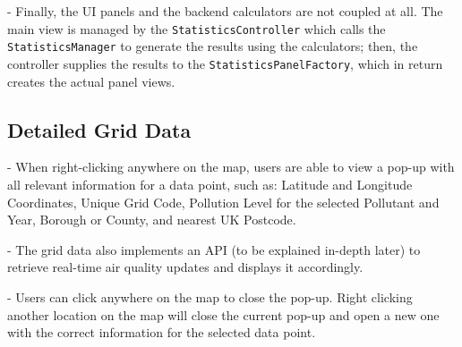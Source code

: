     - Finally, the UI panels and the backend calculators are not coupled at all. The main view is managed by the \verb|StatisticsController| which calls the \verb|StatisticsManager| to generate the results using the calculators; then, the controller supplies the results to the \verb|StatisticsPanelFactory|, which in return creates the actual panel views.

\subsection{Detailed Grid Data}
    - When right-clicking anywhere on the map, users are able to view a pop-up with all relevant information for a data point, such as: Latitude and Longitude Coordinates, Unique Grid Code, Pollution Level for the selected Pollutant and Year, Borough or County, and nearest UK Postcode. 
    
    - The grid data also implements an API (to be explained in-depth later) to retrieve real-time air quality updates and displays it accordingly.
    
    - Users can click anywhere on the map to close the pop-up. Right clicking another location on the map will close the current pop-up and open a new one with the correct information for the selected data point.

